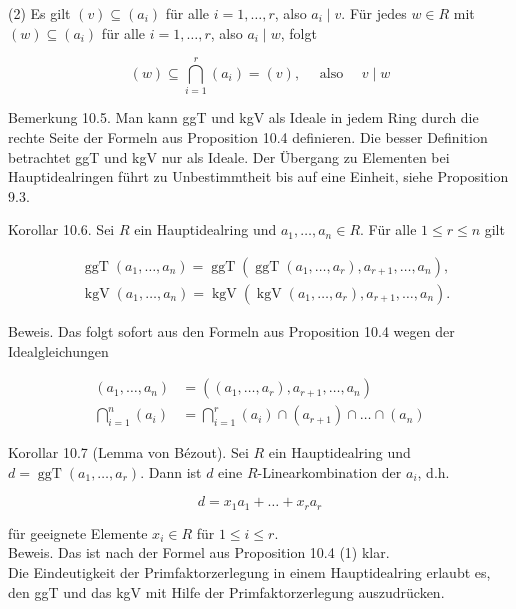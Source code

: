 \documentclass[10pt, letterpaper]{article}
\begin{document}
(2) Es gilt $(v) \subseteq\left(a_{i}\right)$ für alle $i=1, \ldots, r$, also $a_{i} \mid v$. Für jedes $w \in R$ mit $(w) \subseteq\left(a_{i}\right)$ für alle $i=1, \ldots, r$, also $a_{i} \mid w$, folgt

$$
(w) \subseteq \bigcap_{i=1}^{r}\left(a_{i}\right)=(v), \quad \text { also } \quad v \mid w
$$

Bemerkung 10.5. Man kann ggT und kgV als Ideale in jedem Ring durch die rechte Seite der Formeln aus Proposition 10.4 definieren. Die besser Definition betrachtet ggT und kgV nur als Ideale. Der Übergang zu Elementen bei Hauptidealringen führt zu Unbestimmtheit bis auf eine Einheit, siehe Proposition 9.3.

Korollar 10.6. Sei $R$ ein Hauptidealring und $a_{1}, \ldots, a_{n} \in R$. Für alle $1 \leq r \leq n$ gilt

$$
\begin{aligned}
& \operatorname{ggT}\left(a_{1}, \ldots, a_{n}\right)=\operatorname{ggT}\left(\operatorname{ggT}\left(a_{1}, \ldots, a_{r}\right), a_{r+1}, \ldots, a_{n}\right), \\
& \operatorname{kgV}\left(a_{1}, \ldots, a_{n}\right)=\operatorname{kgV}\left(\operatorname{kgV}\left(a_{1}, \ldots, a_{r}\right), a_{r+1}, \ldots, a_{n}\right) .
\end{aligned}
$$

Beweis. Das folgt sofort aus den Formeln aus Proposition 10.4 wegen der Idealgleichungen

$$
\begin{aligned}
\left(a_{1}, \ldots, a_{n}\right) & =\left(\left(a_{1}, \ldots, a_{r}\right), a_{r+1}, \ldots, a_{n}\right) \\
\bigcap_{i=1}^{n}\left(a_{i}\right) & =\bigcap_{i=1}^{r}\left(a_{i}\right) \cap\left(a_{r+1}\right) \cap \ldots \cap\left(a_{n}\right)
\end{aligned}
$$

Korollar 10.7 (Lemma von Bézout). Sei $R$ ein Hauptidealring und $d=\operatorname{ggT}\left(a_{1}, \ldots, a_{r}\right)$. Dann ist $d$ eine $R$-Linearkombination der $a_{i}$, d.h.

$$
d=x_{1} a_{1}+\ldots+x_{r} a_{r}
$$

für geeignete Elemente $x_{i} \in R$ für $1 \leq i \leq r$.\\
Beweis. Das ist nach der Formel aus Proposition 10.4 (1) klar.\\
Die Eindeutigkeit der Primfaktorzerlegung in einem Hauptidealring erlaubt es, den ggT und das kgV mit Hilfe der Primfaktorzerlegung auszudrücken.
\end{document}
